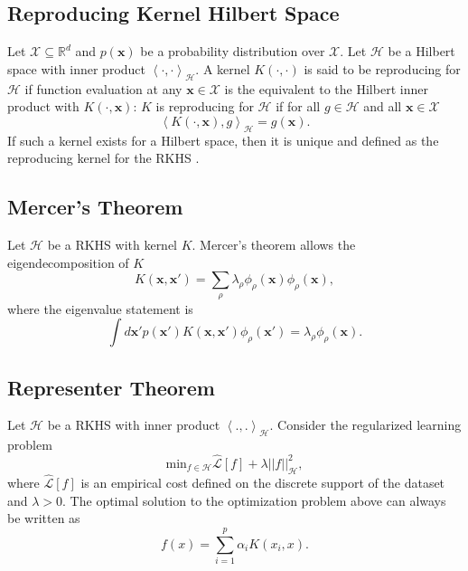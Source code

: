 \documentclass{article}
\begin{document}
\subsection{Reproducing Kernel Hilbert Space}

Let $\mathcal{X} \subseteq \mathbb{R}^d$ and $p(\mathbf{x})$ be a probability distribution over $\mathcal{X}$. Let $\mathcal{H}$ be a Hilbert space with inner product $\left< \cdot , \cdot \right>_{\mathcal{H}}$. A kernel $K(\cdot, \cdot)$ is said to be reproducing for $\mathcal{H}$ if function evaluation at any $\mathbf{x} \in \mathcal{X}$ is the equivalent to the Hilbert inner product with $K(\cdot, \mathbf{x})$: $K$ is reproducing for $\mathcal{H}$ if for all $g \in \mathcal{H}$ and all $\mathbf{x} \in \mathcal{X}$
\begin{equation}
    \left< K(\cdot,\mathbf{x}), g \right>_{\mathcal{H}} = g(\mathbf{x}).
\end{equation}
%
If such a kernel exists for a Hilbert space, then it is unique and defined as the reproducing kernel for the RKHS \cite{poggio_regnets,scholkopf_smola}. 

\subsection{Mercer's Theorem}

Let $\mathcal{H}$ be a RKHS with kernel $K$. Mercer's theorem \cite{mercer1909xvi, GPMLRasmussen} allows the eigendecomposition of $K$
\begin{equation}
    K(\mathbf{x}, \mathbf{x}') = \sum_\rho \lambda_\rho \phi_\rho(\mathbf{x}) \phi_\rho(\mathbf{x}),
\end{equation}
%
where the eigenvalue statement is
\begin{equation}
    \int d\mathbf{x}' p(\mathbf{x}') K(\mathbf{x},\mathbf{x}') \phi_\rho(\mathbf{x}') = \lambda_\rho \phi_\rho(\mathbf{x}).
\end{equation}

\subsection{Representer Theorem}
Let $\mathcal{H}$ be a RKHS with inner product $\left< .,.\right>_{\mathcal{H}}$. Consider the regularized learning problem
\begin{equation}
    \text{min}_{f\in \mathcal{H}} \hat{\mathcal{L}}[f] + \lambda ||f||_{\mathcal{H}}^2,
\end{equation}
where $\hat{\mathcal{L}}[f]$ is an empirical cost defined on the discrete support of the dataset and $\lambda > 0$. The optimal solution to the optimization problem above can always be written as \cite{scholkopf_smola}
\begin{equation}
    f(x) = \sum_{i=1}^p \alpha_i K(x_i,x).
\end{equation}
\end{document}

